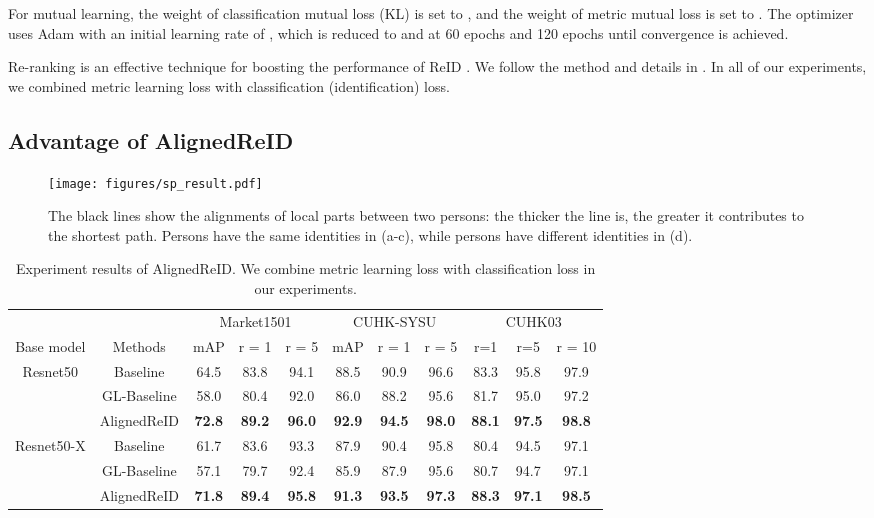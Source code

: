\documentclass[10pt,twocolumn,letterpaper]{article}
\begin{document}
For mutual learning, the weight of classification mutual loss (KL) is set to , and the weight of metric mutual loss is set to .
The optimizer uses Adam with an initial learning rate of , which is reduced to  and  at 60 epochs and 120 epochs until convergence is achieved.

Re-ranking is an effective technique for boosting the performance of ReID \cite{zhong2017re}. We follow the method and details in \cite{zhong2017re}. In all of our experiments, we combined metric learning loss with classification (identification) loss. 

\subsection{Advantage of AlignedReID}

\begin{figure}[tb]
\centering
\texttt{[image: figures/sp\_result.pdf]}
\caption{The black lines show the alignments of local parts between two persons:
the thicker the line is, the greater it contributes to the shortest path.
Persons have the same identities in (a-c), while persons have different identities in (d).}
\label{fig:SP_result}
\end{figure}


\renewcommand{\multirowsetup}{\centering}  
\begin{table*}[t]\small 
  \begin{center}
  \begin{tabular}{c|c|ccc|ccc|ccc}
    \hline
     							& 			& \multicolumn{3}{c|}{Market1501}	& \multicolumn{3}{c|}{CUHK-SYSU}	& \multicolumn{3}{c}{CUHK03}	\\
    Base model					& Methods 	& mAP 	& r = 1	& r = 5		& mAP 	& r = 1	&r = 5		& r=1 	&r=5		& r = 10	\\
    \hline
    \hline
     \multirow{2}{1.8cm}{Resnet50}	& Baseline	&64.5 	&83.8	&94.1		&88.5	&90.9	&96.6		&83.3	&95.8	&97.9	\\     							
    							& GL-Baseline  &58.0 	&80.4   	&92.0 		&86.0 	&88.2 	&95.6 		&81.7 	&95.0	&97.2	\\
                    					& AlignedReID	&\textbf{72.8} &\textbf{89.2} &\textbf{96.0} &\textbf{92.9} &\textbf{94.5}	&\textbf{98.0}	&\textbf{88.1}	&\textbf{97.5}	&\textbf{98.8}	\\
   \hline
    \multirow{2}{1.8cm}{Resnet50-X} 	& Baseline	&61.7	&83.6	&93.3		&87.9 	&90.4	&95.8	&80.4	&94.5	&97.1	\\      							
    							& GL-Baseline  &57.1 &79.7 &92.4 				&85.9 &87.9 &95.6 &80.7 &94.7 &97.1 \\
                    					& AlignedReID	&\textbf{71.8}& \textbf{89.4}& \textbf{95.8} &\textbf{91.3}	&\textbf{93.5} &\textbf{97.3} &\textbf{88.3} &\textbf{97.1}	&\textbf{98.5}\\  \hline
  \end{tabular}
  \end{center}
  \caption{\label{Table2}Experiment results of AlignedReID. We combine metric learning loss with classification loss in our experiments.}
\end{table*}
\end{document}
